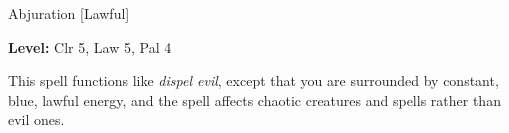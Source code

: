 
Abjuration [Lawful]

\textbf{Level:} Clr 5, Law 5, Pal 4

This spell functions like \textit{dispel evil}, except that you are surrounded 
by constant, blue, lawful energy, and the spell affects chaotic creatures and spells 
rather than evil ones.

